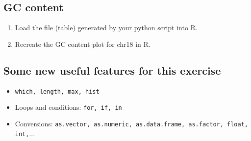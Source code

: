 \documentclass[a4paper,11pt]{article}
\begin{document}
\subsection{GC content}
\begin{enumerate}
\item Load the file (table) generated by your python script into R.
\item Recreate the GC content plot for chr18 in R.
\end{enumerate}

\subsection{Some new useful features for this exercise}
\begin{itemize}
\item \texttt{which, length, max, hist}
\item Loops and conditions: \texttt{for, if, in}
\item Conversions: \texttt{as.vector, as.numeric, as.data.frame, as.factor, float, int,}...
\end{itemize}
\end{document}
